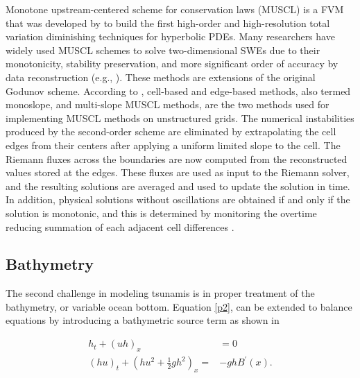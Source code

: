 \documentclass[10pt,a4paper]{article}
\begin{document}
Monotone upstream-centered scheme for conservation laws (MUSCL) is a FVM that was developed by  \citet{van1979towards} to build the first high-order and high-resolution total variation diminishing techniques for hyperbolic PDEs. Many researchers have widely used MUSCL schemes to solve two-dimensional SWEs due to their monotonicity, stability preservation, and more significant order of accuracy by data reconstruction (e.g., \cite{song2011robust,zhao2019improved,marche2007evaluation,liang2009adaptive}).  These methods are extensions of the original Godunov scheme.     According to \citet{hou20132d}, cell-based and edge-based methods, also termed monoslope, and multi-slope MUSCL methods, are the two methods used for implementing MUSCL methods on unstructured grids. The numerical instabilities produced by the second-order scheme are eliminated by extrapolating the cell edges from their centers after applying a uniform limited slope to the cell. The Riemann fluxes across the boundaries are now computed from the reconstructed values stored at the edges.  These fluxes are used as input to the Riemann solver, and the resulting solutions are averaged and used to update the solution in time.  In addition, physical solutions without oscillations are obtained if and only if the solution is monotonic, and this is determined by monitoring the overtime reducing summation of each adjacent cell differences \cite{hou2014multislope}.





	
	\subsection{Bathymetry}
	The second challenge in modeling tsunamis is in proper treatment of the bathymetry, or variable ocean bottom. 
	Equation \eqref{p2}, can be extended to balance equations by introducing a bathymetric source term as shown in 

		\begin{equation}
		\begin{aligned}
			h_{t} + (uh)_x &= 0 \\
			(hu)_t + \left(hu^{2} + \frac{1}{2}gh^{2} \right)_x =& -ghB^{\prime}(x).
			\label{bst}
		\end{aligned}
	\end{equation}
\end{document}
